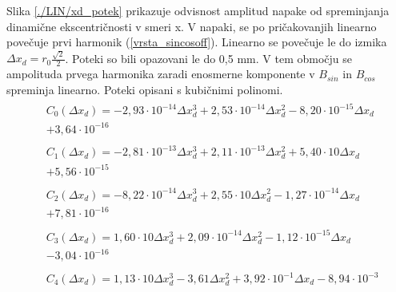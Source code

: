 \newpage
Slika \ref{./LIN/xd_potek} prikazuje odvisnost amplitud napake od spreminjanja dinamične ekscentričnosti v smeri x. V napaki, se po pričakovanjih linearno povečuje prvi harmonik (\ref{vrsta_sincosoff}). Linearno se povečuje le do izmika $\Delta x_d = r_0 \frac{\sqrt{2}}{2}$. Poteki so bili opazovani le do 0,5 mm. V tem območju se ampolituda prvega harmonika zaradi enosmerne komponente v $B_{sin}$ in $B_{cos}$ spreminja linearno.
Poteki opisani s kubičnimi polinomi.
\begin{eqnarray}
\label{nap_lin_xd}
&\begin{split}C_0(\Delta x_d) =-2,93\cdot 10^{-14}\Delta x_d^{3}+2,53\cdot 10^{-14}\Delta x_d^{2}-8,20\cdot 10^{-15}\Delta x_d\\+3,64\cdot 10^{-16}\end{split} \\
&\begin{split}C_1(\Delta x_d) =-2,81\cdot 10^{-13}\Delta x_d^{3}+2,11\cdot 10^{-13}\Delta x_d^{2}+5,40\cdot 10\Delta x_d\\+5,56\cdot 10^{-15} \end{split}\\      
&\begin{split}C_2(\Delta x_d) =-8,22\cdot 10^{-14}\Delta x_d^{3}+2,55\cdot 10\Delta x_d^{2}-1,27\cdot 10^{-14}\Delta x_d\\+7,81\cdot 10^{-16} \end{split}\\      
&\begin{split}C_3(\Delta x_d) =1,60\cdot 10\Delta x_d^{3}+2,09\cdot 10^{-14}\Delta x_d^{2}-1,12\cdot 10^{-15}\Delta x_d\\-3,04\cdot 10^{-16} \end{split}\\       
&\begin{split}C_4(\Delta x_d) =1,13\cdot 10\Delta x_d^{3}-3,61\Delta x_d^{2}+3,92\cdot 10^{-1}\Delta x_d-8,94\cdot 10^{-3}\end{split}
\end{eqnarray}
